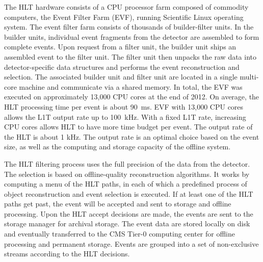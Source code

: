 The HLT hardware consists of a CPU processor farm composed of commodity computers, the Event Filter Farm (EVF), running Scientific Linux operating system. The event filter farm consists of thousands of builder-filter units. In the builder units, individual event fragments from the detector are assembled to form complete events. Upon request from a filter unit, the builder unit ships an assembled event to the filter unit. The filter unit then unpacks the raw data into detector-specific data structures and performs the event reconstruction and selection. The associated builder unit and filter unit are located in a single multi-core machine and communicate via a shared memory. In total, the EVF was executed on approximately 13,000 CPU cores at the end of 2012. On average, the HLT processing time per event is about 90~ms. EVF with 13,000 CPU cores allows the L1T output rate up to 100~kHz. With a fixed L1T rate, increasing CPU cores allows HLT to have more time budget per event. The output rate of the HLT is about 1 kHz. The output rate is an optimal choice based on the event size, as well as the computing and storage capacity of the offline system.

The HLT filtering process uses the full precision of the data from the detector. The selection is based on offline-quality reconstruction algorithms. It works by computing a menu of the HLT paths, in each of which a predefined process of object reconstruction and event selection is executed. If at least one of the HLT paths get past, the event will be accepted and sent to storage and offline processing. Upon the HLT accept decisions are made, the events are sent to the storage manager for archival storage. The event data are stored locally on disk and eventually transferred to the CMS Tier-0 computing center for offline processing and permanent storage. Events are grouped into a set of non-exclusive streams according to the HLT decisions.
